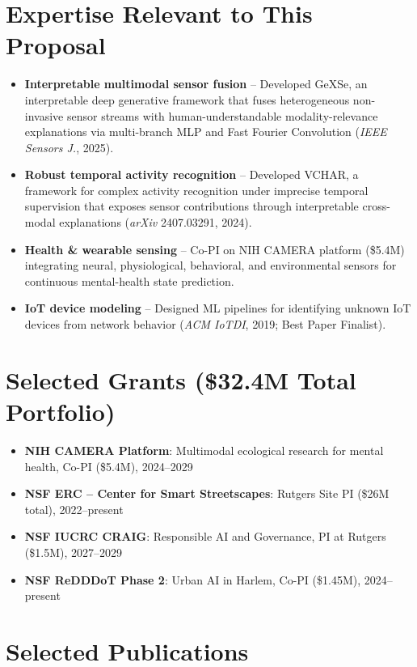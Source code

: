 \documentclass[11pt,letterpaper]{article}
\begin{document}
\section{Expertise Relevant to This Proposal}

{\small\begin{itemize}
\item \textbf{Interpretable multimodal sensor fusion} -- Developed GeXSe, an interpretable deep generative framework that fuses heterogeneous non-invasive sensor streams with human-understandable modality-relevance explanations via multi-branch MLP and Fast Fourier Convolution (\textit{IEEE Sensors J.}, 2025).
\item \textbf{Robust temporal activity recognition} -- Developed VCHAR, a framework for complex activity recognition under imprecise temporal supervision that exposes sensor contributions through interpretable cross-modal explanations (\textit{arXiv} 2407.03291, 2024).
\item \textbf{Health \& wearable sensing} -- Co-PI on NIH CAMERA platform (\$5.4M) integrating neural, physiological, behavioral, and environmental sensors for continuous mental-health state prediction.
\item \textbf{IoT device modeling} -- Designed ML pipelines for identifying unknown IoT devices from network behavior (\textit{ACM IoTDI}, 2019; Best Paper Finalist).
\end{itemize}}

\section{Selected Grants (\$32.4M Total Portfolio)}

{\small\begin{itemize}
\item \textbf{NIH CAMERA Platform}: Multimodal ecological research for mental health, Co-PI (\$5.4M), 2024--2029
\item \textbf{NSF ERC -- Center for Smart Streetscapes}: Rutgers Site PI (\$26M total), 2022--present
\item \textbf{NSF IUCRC CRAIG}: Responsible AI and Governance, PI at Rutgers (\$1.5M), 2027--2029
\item \textbf{NSF ReDDDoT Phase 2}: Urban AI in Harlem, Co-PI (\$1.45M), 2024--present
\end{itemize}}

\section{Selected Publications}
\end{document}
